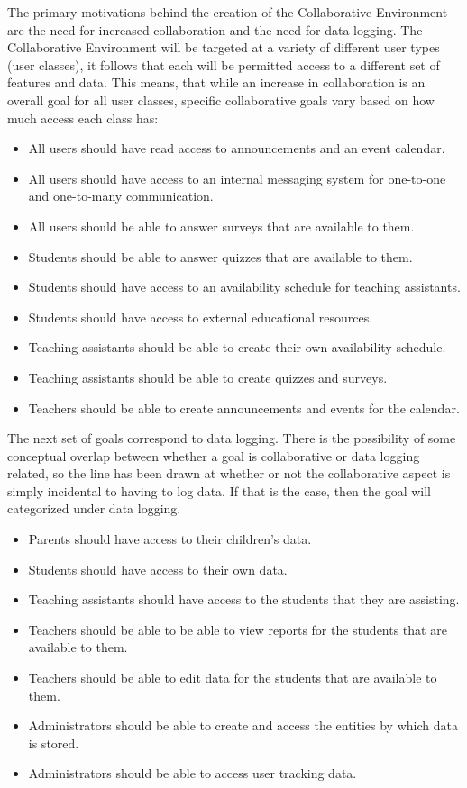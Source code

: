 \documentclass[letterpaper,12pt]{report}
\begin{document}
The primary motivations behind the creation of the Collaborative Environment are the need for increased collaboration and the need for data logging. The Collaborative Environment will be targeted at a variety of different user types (user classes), it follows that each will be permitted access to a different set of features and data. This means, that while an increase in collaboration is an overall goal for all user classes, specific collaborative goals vary based on how much access each class has:

\begin{itemize}
	\item All users should have read access to announcements and an event calendar.
	\item All users should have access to an internal messaging system for one-to-one and one-to-many communication.
	\item All users should be able to answer surveys that are available to them.
	\item Students should be able to answer quizzes that are available to them.
	\item Students should have access to an availability schedule for teaching assistants.
	\item Students should have access to external educational resources.
	\item Teaching assistants should be able to create their own availability schedule.
	\item Teaching assistants should be able to create quizzes and surveys.
	\item Teachers should be able to create announcements and events for the calendar.
\end{itemize}

The next set of goals correspond to data logging. There is the possibility of some conceptual overlap between whether a goal is collaborative or data logging related, so the line has been drawn at whether or not the collaborative aspect is simply incidental to having to log data. If that is the case, then the goal will categorized under data logging.

\begin{itemize}
\item Parents should have access to their children's data.
\item Students should have access to their own data.
\item Teaching assistants should have access to the students that they are assisting.
\item Teachers should be able to be able to view reports for the students that are available to them.
\item Teachers should be able to edit data for the students that are available to them.
\item Administrators should be able to create and access the entities by which data is stored.
\item Administrators should be able to access user tracking data.
\end{itemize}
\end{document}
